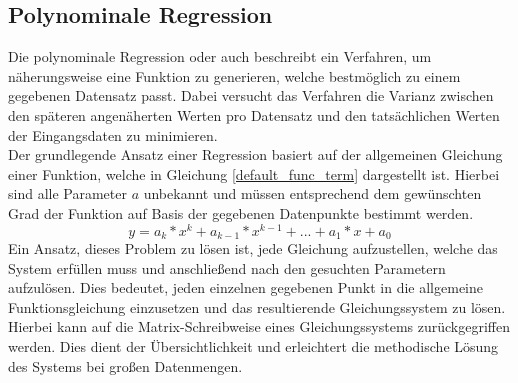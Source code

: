 \subsection{Polynominale Regression}\label{sub: polynominal_regression}
Die polynominale Regression oder auch  beschreibt ein Verfahren, um näherungsweise eine Funktion zu generieren, welche bestmöglich zu einem gegebenen Datensatz passt. Dabei versucht das Verfahren die Varianz zwischen den späteren angenäherten Werten pro Datensatz und den tatsächlichen Werten der Eingangsdaten zu minimieren.\\
Der grundlegende Ansatz einer Regression basiert auf der allgemeinen Gleichung einer Funktion, welche in Gleichung \ref{default_func_term} dargestellt ist. Hierbei sind alle Parameter $a$ unbekannt und müssen entsprechend dem gewünschten Grad der Funktion auf Basis der gegebenen Datenpunkte bestimmt werden.
\begin{equation}\label{default_func_term}
    y = a_k*x^k + a_{k-1} * x^{k-1} + ... + a_1*x + a_0
\end{equation}
Ein Ansatz, dieses Problem zu lösen ist, jede Gleichung aufzustellen, welche das System erfüllen muss und anschließend nach den gesuchten Parametern aufzulösen. Dies bedeutet, jeden einzelnen gegebenen Punkt in die allgemeine Funktionsgleichung einzusetzen und das resultierende Gleichungssystem zu lösen. Hierbei kann auf die Matrix-Schreibweise eines Gleichungssystems zurückgegriffen werden. Dies dient der Übersichtlichkeit und erleichtert die methodische Lösung des Systems bei großen Datenmengen.

